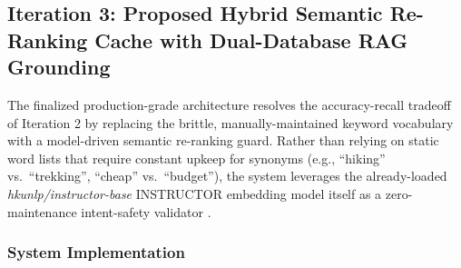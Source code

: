 \documentclass{ieeeaccess}
\begin{document}
\subsection{Iteration 3: Proposed Hybrid Semantic Re-Ranking Cache with Dual-Database RAG Grounding}
The finalized production-grade architecture resolves the accuracy-recall tradeoff of Iteration 2 by replacing the brittle, manually-maintained keyword vocabulary with a model-driven semantic re-ranking guard. Rather than relying on static word lists that require constant upkeep for synonyms (e.g., ``hiking'' vs.\ ``trekking'', ``cheap'' vs.\ ``budget''), the system leverages the already-loaded \emph{hkunlp/instructor-base} INSTRUCTOR embedding model itself as a zero-maintenance intent-safety validator \cite{reimers-sbert-2019}.

\subsubsection{System Implementation}
\end{document}
